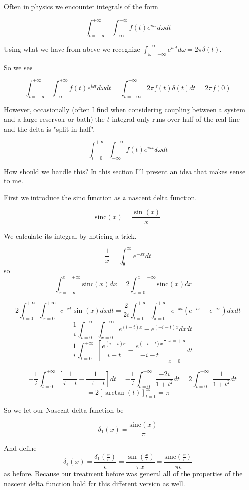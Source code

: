\documentclass[12pt]{article}
\newcommand{\ep}{\epsilon}
\newcommand{\sinc}{\text{sinc}}
\begin{document}
Often in physics we encounter integrals of the form

\[
\int_{t=-\infty}^{+\infty}\int_{-\infty}^{+\infty} f(t) e^{i \omega t} d\omega dt
\]

Using what we have from above we recognize $\int_{\omega=-\infty}^{+\infty} e^{i\omega t} d\omega = 2\pi \delta(t)$.

So we see 

\[
\int_{t=-\infty}^{+\infty}\int_{-\infty}^{+\infty} f(t) e^{i \omega t} d\omega dt = \int_{t=-\infty}^{+\infty} 2\pi f(t) \delta(t) dt = 2\pi f(0)
\]

However, occasionally (often I find when considering coupling between a system and a large reservoir or bath) the $t$ integral only runs over half of the real line and the delta is "split in half". 

\[
\int_{t=0}^{+\infty}\int_{-\infty}^{+\infty} f(t) e^{i \omega t} d\omega dt
\]

How should we handle this? In this section I'll present an idea that makes sense to me.

First we introduce the sinc function as a nascent delta function.

\[ 
\sinc(x) = \frac{\sin(x)}{x}
\]

We calculate its integral by noticing a trick.

\[
\frac{1}{x} = \int_0^{\infty} e^{-xt} dt
\]
so
\[
\int_{x=-\infty}^{x=+\infty} \sinc(x) dx = 2\int_{x=0}^{x=+\infty} \sinc(x) dx =
\]

\[ 2\int_{t=0}^{+\infty} \int_{x=0}^{+\infty} e^{-xt} \sin(x) dx dt = \frac{2}{2i}\int_{t=0}^{+\infty} \int_{x=0}^{+\infty} e^{-xt}(e^{+ix}-e^{-ix})dxdt
\]
\[
= \frac{1}{i} \int_{t=0}^{+\infty} \int_{x=0}^{+\infty} e^{(i-t)x} - e^{(-i-t)x} dx dt
\]
\[
= \frac{1}{i} \int_{t=0}^{+\infty} \left[\frac{e^{(i-t)x}}{i-t} - \frac{e^{(-i-t)x}}{-i-t} \right]_{x=0}^{x=+\infty} dt 
\]

\[
= -\frac{1}{i} \int_{t=0}^{+\infty} \left[\frac{1}{i-t} - \frac{1}{-i-t}\right] dt = -\frac{1}{i} \int_{t=0}^{+\infty} \frac{-2i}{1+t^2} dt = 2 \int_{t=0}^{+\infty} \frac{1}{1+t^2} dt
\]
\[
= 2 \left[\arctan(t)\right]_{t=0}^{\infty} = \pi
\]

So we let our Nascent delta function be

\[
\delta_1(x) = \frac{\sinc(x)}{\pi}
\]

And define 
\[
\delta_{\ep}(x) = \frac{\delta_1(\frac{x}{\ep})}{\ep} = \frac{\sin\left(\frac{x}{\ep}\right)}{\pi x} = \frac{\text{sinc}\left(\frac{x}{\epsilon}\right)}{\pi \epsilon}
\] 
as before. Because our treatment before was general all of the properties of the nascent delta function hold for this different version as well. 
\end{document}
